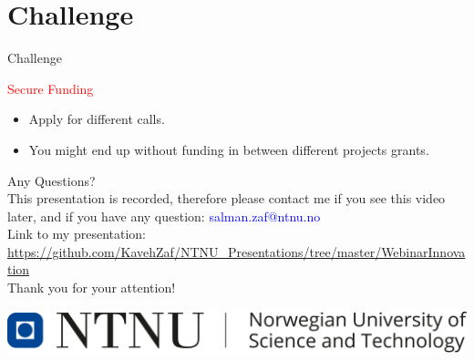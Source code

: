 \documentclass[12pt]{beamer}
\begin{document}
\section{Challenge}
\begin{frame}{Challenge}
\begin{alertblock}{\textcolor{red}{Secure Funding}}
\begin{itemize}
\item Apply for different calls.
\item You might end up without funding in between different projects grants. 
\end{itemize}

\end{alertblock}
\end{frame}
\begin{frame}
\centering
Any Questions?\\
This presentation is recorded, therefore please contact me if you see this video later, and if you have any question: \textcolor{blue}{salman.zaf@ntnu.no}\\
Link to my presentation:\\
\textcolor{blue}{\tiny \url{https://github.com/KavehZaf/NTNU_Presentations/tree/master/WebinarInnovation}}\\
Thank you for your attention!\\
		\vskip 0.8cm

\centering
\includegraphics[scale=0.2]{ntnulogo_eng.png}
\end{frame} 
\end{document}
